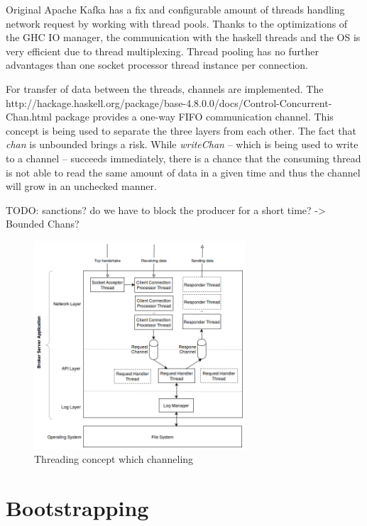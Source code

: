 Original Apache Kafka has a fix and configurable amount of threads
handling network request by working with thread pools. Thanks to the
optimizations of the GHC IO manager, the communication with the haskell threads
and the OS is very efficient due to thread multiplexing. Thread pooling has no
further advantages than one socket processor thread instance per connection. 

For transfer of data between the threads, channels are implemented. The 
{http://hackage.haskell.org/package/base-4.8.0.0/docs/Control-Concurrent-Chan.html}
package provides a one-way FIFO communication channel. This concept
is being used to separate the three layers from each other. The
fact that \textit{chan} is unbounded brings a risk. While \textit{writeChan} --
which is being used to write to a channel -- succeeds immediately, there is a
chance that the consuming thread is not able to read the same amount of data in
a given time and thus the channel will grow in an unchecked manner.
\cite{o2008real}

TODO: sanctions? do we have to block the producer for a short time? -> Bounded
Chans? 

\begin{figure}[H]
    \centering
    \includegraphics[width=0.7\textwidth]{images/impl-brok-threading.png}
    \caption{Threading concept which channeling}
    \label{fig:impl-brok-threading}
\end{figure}

\section{Bootstrapping}



